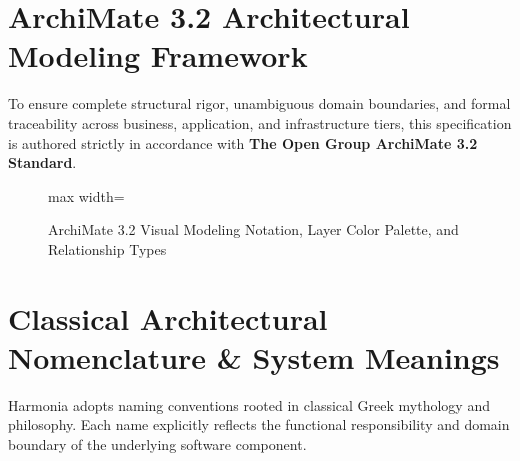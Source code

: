 \section*{ArchiMate 3.2 Architectural Modeling Framework}

To ensure complete structural rigor, unambiguous domain boundaries, and formal traceability across business, application, and infrastructure tiers, this specification is authored strictly in accordance with \textbf{The Open Group ArchiMate 3.2 Standard}.

\begin{figure}[htbp]
    \centering
    \begin{adjustbox}{max width=\textwidth}
        
    \end{adjustbox}
    \caption{ArchiMate 3.2 Visual Modeling Notation, Layer Color Palette, and Relationship Types}
    \label{fig:archimate_legend}
\end{figure}

\section*{Classical Architectural Nomenclature \& System Meanings}

Harmonia adopts naming conventions rooted in classical Greek mythology and philosophy. Each name explicitly reflects the functional responsibility and domain boundary of the underlying software component.

